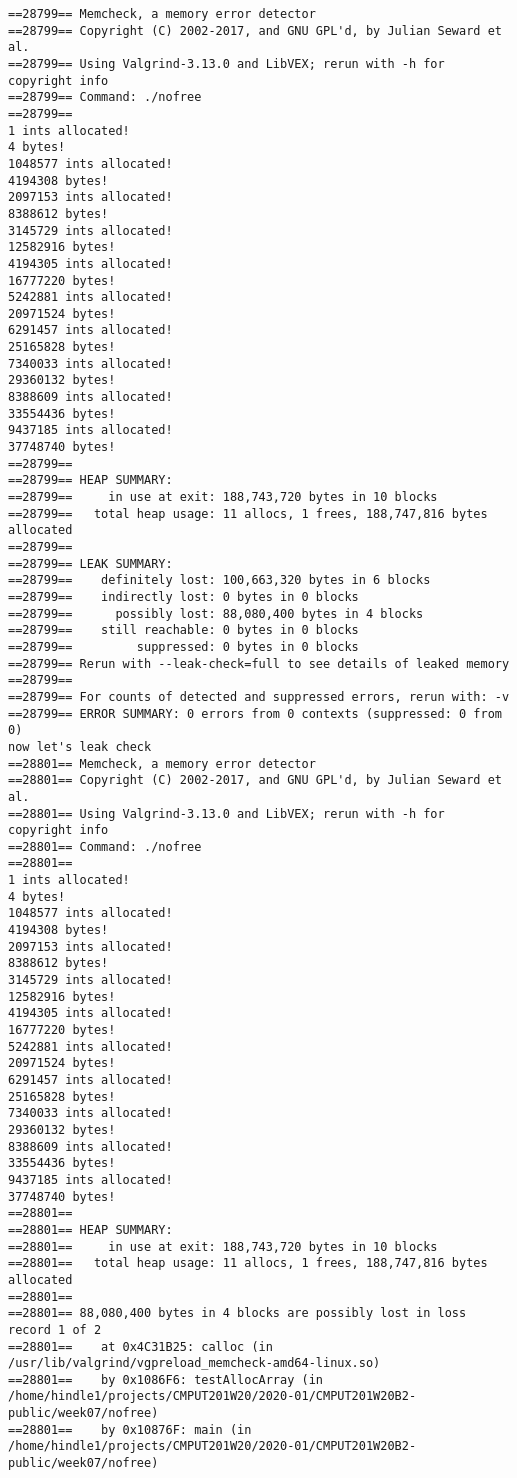 \documentclass[11pt]{article}
\begin{document}
\begin{verbatim}
==28799== Memcheck, a memory error detector
==28799== Copyright (C) 2002-2017, and GNU GPL'd, by Julian Seward et al.
==28799== Using Valgrind-3.13.0 and LibVEX; rerun with -h for copyright info
==28799== Command: ./nofree
==28799== 
1 ints allocated!
4 bytes!
1048577 ints allocated!
4194308 bytes!
2097153 ints allocated!
8388612 bytes!
3145729 ints allocated!
12582916 bytes!
4194305 ints allocated!
16777220 bytes!
5242881 ints allocated!
20971524 bytes!
6291457 ints allocated!
25165828 bytes!
7340033 ints allocated!
29360132 bytes!
8388609 ints allocated!
33554436 bytes!
9437185 ints allocated!
37748740 bytes!
==28799== 
==28799== HEAP SUMMARY:
==28799==     in use at exit: 188,743,720 bytes in 10 blocks
==28799==   total heap usage: 11 allocs, 1 frees, 188,747,816 bytes allocated
==28799== 
==28799== LEAK SUMMARY:
==28799==    definitely lost: 100,663,320 bytes in 6 blocks
==28799==    indirectly lost: 0 bytes in 0 blocks
==28799==      possibly lost: 88,080,400 bytes in 4 blocks
==28799==    still reachable: 0 bytes in 0 blocks
==28799==         suppressed: 0 bytes in 0 blocks
==28799== Rerun with --leak-check=full to see details of leaked memory
==28799== 
==28799== For counts of detected and suppressed errors, rerun with: -v
==28799== ERROR SUMMARY: 0 errors from 0 contexts (suppressed: 0 from 0)
now let's leak check
==28801== Memcheck, a memory error detector
==28801== Copyright (C) 2002-2017, and GNU GPL'd, by Julian Seward et al.
==28801== Using Valgrind-3.13.0 and LibVEX; rerun with -h for copyright info
==28801== Command: ./nofree
==28801== 
1 ints allocated!
4 bytes!
1048577 ints allocated!
4194308 bytes!
2097153 ints allocated!
8388612 bytes!
3145729 ints allocated!
12582916 bytes!
4194305 ints allocated!
16777220 bytes!
5242881 ints allocated!
20971524 bytes!
6291457 ints allocated!
25165828 bytes!
7340033 ints allocated!
29360132 bytes!
8388609 ints allocated!
33554436 bytes!
9437185 ints allocated!
37748740 bytes!
==28801== 
==28801== HEAP SUMMARY:
==28801==     in use at exit: 188,743,720 bytes in 10 blocks
==28801==   total heap usage: 11 allocs, 1 frees, 188,747,816 bytes allocated
==28801== 
==28801== 88,080,400 bytes in 4 blocks are possibly lost in loss record 1 of 2
==28801==    at 0x4C31B25: calloc (in /usr/lib/valgrind/vgpreload_memcheck-amd64-linux.so)
==28801==    by 0x1086F6: testAllocArray (in /home/hindle1/projects/CMPUT201W20/2020-01/CMPUT201W20B2-public/week07/nofree)
==28801==    by 0x10876F: main (in /home/hindle1/projects/CMPUT201W20/2020-01/CMPUT201W20B2-public/week07/nofree)

\end{verbatim}
\end{document}
